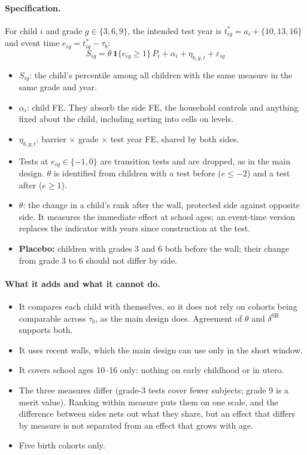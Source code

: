 \documentclass[11pt]{article}
\begin{document}
\paragraph{Specification.} For child \(i\) and grade \(g \in \{3, 6, 9\}\), the intended test year
is \(t^*_{ig} = a_i + \{10, 13, 16\}\) and event time \(e_{ig} = t^*_{ig} - \tau_b\):
\[
S_{ig} = \theta\, \mathbf{1}\{e_{ig} \ge 1\}\, P_i + \alpha_i + \eta_{b,g,t} + \varepsilon_{ig}
\]
\begin{itemize}
\item \(S_{ig}\): the child's percentile among all children with the same measure in the same
  grade and year.
\item \(\alpha_i\): child FE. They absorb the side FE, the household controls and anything fixed
  about the child, including sorting into cells on levels.
\item \(\eta_{b,g,t}\): barrier \(\times\) grade \(\times\) test year FE, shared by both sides.
\item Tests at \(e_{ig} \in \{-1, 0\}\) are transition tests and are dropped, as in the main
  design. \(\theta\) is identified from children with a test before (\(e \le -2\)) and a test
  after (\(e \ge 1\)).
\item \(\theta\): the change in a child's rank after the wall, protected side against opposite
  side. It measures the immediate effect at school ages; an event-time version replaces the
  indicator with years since construction at the test.
\item \textbf{Placebo:} children with grades 3 and 6 both before the wall; their change from
  grade 3 to 6 should not differ by side.
\end{itemize}

\paragraph{What it adds and what it cannot do.}
\begin{itemize}
\item It compares each child with themselves, so it does not rely on cohorts being comparable
  across \(\tau_b\), as the main design does. Agreement of \(\theta\) and \(\delta^{\text{SR}}\)
  supports both.
\item It uses recent walls, which the main design can use only in the short window.
\item It covers school ages 10--16 only: nothing on early childhood or in utero.
\item The three measures differ (grade-3 tests cover fewer subjects; grade 9 is a merit value).
  Ranking within measure puts them on one scale, and the difference between sides nets out what
  they share, but an effect that differs by measure is not separated from an effect that grows
  with age.
\item Five birth cohorts only.
\end{itemize}
\end{document}

